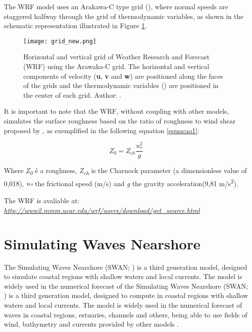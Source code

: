 \noindent The WRF model uses an Arakawa-C type grid (\cite{Arakawa1977}), where normal speeds are staggered halfway through the grid of thermodynamic variables, as shown in the 
schematic representation illustrated in Figure \textcolor{bleu_cite}{\ref{gradeswrf}}.
\bigskip

\begin{figure}[H]
    \centering
    \texttt{[image: grid\_new.png]}
    \caption{Horizontal and vertical grid of Weather Research and Forecast (WRF) using the Arawaka-C grid. The horizontal and vertical components
                        of velocity (\textbf{u}, \textbf{v} and \textbf{w}) are positioned along the faces of the grids and the thermodynamic variables
                        (\straighttheta) are positioned in the center of each grid. \newline Author: \textcite{Skamarock2008}.}
    \label{gradeswrf}
\end{figure}
\bigskip

\noindent It is important to note that the WRF, without coupling with other models, simulates the surface roughness based on the ratio of roughness to wind 
shear proposed by \textcite{Charnock1955}, as exemplified in the following equation \textcolor{bleu_cite}{\ref{equacao1}}:
\bigskip

\begin{equation}
Z_{0} = Z_{ch} \frac{u_{*}^{2}}{g}
\label{equacao1}
\end{equation}

\bigskip

\noindent Where \textit{Z\textsubscript{0}} é a roughness, \textit{Z\textsubscript{ch}} is the Charnock parameter (a dimensionless value of 0,018), \textit{u\textsubscript{*}} 
the frictional speed (m/s) and \textit{g} the gravity acceleration(9,81 m/s\textsuperscript{2}).
\bigskip

\noindent The WRF is avaliable at: \textcolor{bleu_cite}{\href{http://www2.mmm.ucar.edu/wrf/users/download/get\_source.html}{\textit{http://www2.mmm.ucar.edu/wrf/users/download/get\_source.html}}}
\bigskip


\section{Simulating Waves Nearshore}\label{swansecao}
\bigskip

\noindent The Simulating Waves Nearshore (SWAN; \cite{Booij1999, Booij1996}) is a third generation model,
designed to simulate coastal regions with shallow waters and local currents. The model is widely used in the numerical forecast of the Simulating Waves Nearshore (SWAN; \cite{Booij1999, Booij1996}) is a third generation model,
designed to compute in coastal regions with shallow waters and local currents. The model is widely used in the numerical forecast of waves in coastal regions, estuaries,  channels and 
others, being able to use fields of wind, bathymetry and currents provided by other models \parencite{Booij1999, Booij1996}.
\bigskip

